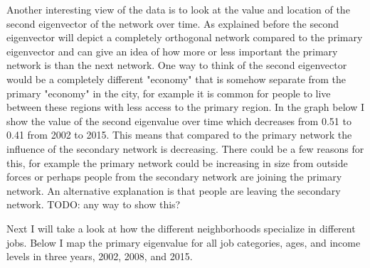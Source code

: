 \documentclass{article}
\theoremstyle{definition}
\theoremstyle{remark}
\begin{document}
Another interesting view of the data is to look at the value and location of the second eigenvector of the network over time.  As explained before the second eigenvector will depict a completely orthogonal network compared to the primary eigenvector and can give an idea of how more or less important the primary network is than the next network. One way to think of the second eigenvector would be a completely different "economy" that is somehow separate from the primary "economy" in the city, for example it is common for people to live between these regions with less access to the primary region.  In the graph below I show the value of the second eigenvalue over time which decreases from 0.51 to 0.41 from 2002 to 2015.  This means that compared to the primary network the influence of the secondary network is decreasing.  There could be a few reasons for this, for example the primary network could be increasing in size from outside forces or perhaps people from the secondary network are joining the primary network.  An alternative explanation is that people are leaving the secondary network. TODO: any way to show this?\\
\begin{center}
\end{center}

Next I will take a look at how the different neighborhoods specialize in different jobs.  Below I map the primary eigenvalue for all job categories, ages, and income levels in three years, 2002, 2008, and 2015.
\end{document}
